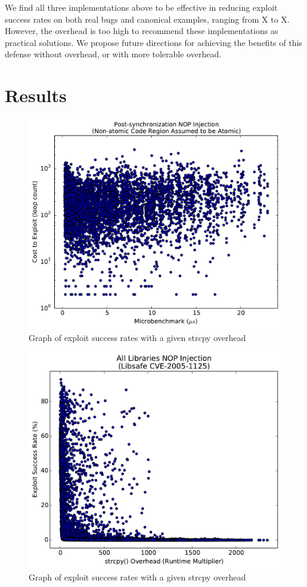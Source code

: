 \documentclass[letterpaper,twocolumn,10pt]{article}
\begin{document}
We find all three implementations above to be effective in reducing exploit success rates on both real bugs and canonical examples, ranging from X to X.  However, the overhead is too high to recommend these implementations as practical solutions.  We propose future directions for achieving the benefits of this defense without overhead, or with more tolerable overhead.

\section{Results}

\begin{figure}
\centering
\includegraphics[width=\columnwidth]{figures/nonatomic-post}
\caption{Graph of exploit success rates with a given strcpy overhead}
\label{fig_nonatomic-post}
\end{figure}

\begin{figure}
\centering
\includegraphics[width=\columnwidth]{figures/libsafe-all}
\caption{Graph of exploit success rates with a given strcpy overhead}
\label{fig_libsafe-all}
\end{figure}
\end{document}
